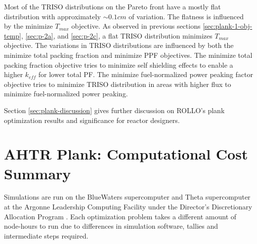 Most of the \gls{TRISO} distributions on the Pareto front have a mostly flat 
distribution with approximately $\sim0.1cm$ of variation. 
The flatness is influenced by the minimize $T_{max}$ objective. 
As observed in previous sections \ref{sec:plank-1-obj-temp}, \ref{sec:p-2a}, and 
\ref{sec:p-2c}, a flat \gls{TRISO} distribution minimizes $T_{max}$ objective.
The variations in \gls{TRISO} distributions are influenced by both the minimize 
total packing fraction and minimize PPF objectives. 
The minimize total packing fraction objective tries to minimize self shielding effects 
to enable a higher $k_{eff}$ for lower total PF. 
The minimize fuel-normalized power peaking factor objective tries to minimize 
TRISO distribution in areas with higher flux to minimize fuel-normalized power peaking.

Section \ref{sec:plank-discussion} gives further discussion on \gls{ROLLO}'s plank 
optimization results and significance for reactor designers.

\pagebreak
\section{AHTR Plank: Computational Cost Summary}
\label{sec:plank-compute-cost}
Simulations are run on the BlueWaters supercomputer \cite{ncsa_about_2017} and Theta 
supercomputer at the Argonne Leadership Computing Facility under the Director's 
Discretionary Allocation Program \cite{noauthor_argonne_2022}. 
Each optimization problem takes a different amount of node-hours to run due to 
differences in simulation software, tallies and intermediate steps required. 

